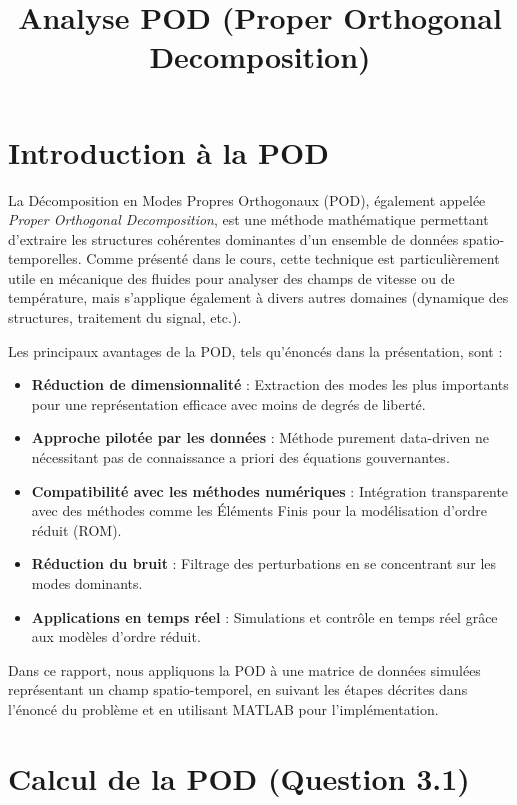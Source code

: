\documentclass{rapportECL}
\title{Analyse POD (Proper Orthogonal Decomposition)}
\begin{document}

\fairemarges
\fairepagedegarde
\tabledematieres

\section{Introduction à la POD}

La Décomposition en Modes Propres Orthogonaux (POD), également appelée \emph{Proper Orthogonal Decomposition}, est une méthode mathématique permettant d'extraire les structures cohérentes dominantes d'un ensemble de données spatio-temporelles. Comme présenté dans le cours, cette technique est particulièrement utile en mécanique des fluides pour analyser des champs de vitesse ou de température, mais s'applique également à divers autres domaines (dynamique des structures, traitement du signal, etc.).

Les principaux avantages de la POD, tels qu'énoncés dans la présentation, sont :
\begin{itemize}
    \item \textbf{Réduction de dimensionnalité} : Extraction des modes les plus importants pour une représentation efficace avec moins de degrés de liberté.
    \item \textbf{Approche pilotée par les données} : Méthode purement data-driven ne nécessitant pas de connaissance a priori des équations gouvernantes.
    \item \textbf{Compatibilité avec les méthodes numériques} : Intégration transparente avec des méthodes comme les Éléments Finis pour la modélisation d'ordre réduit (ROM).
    \item \textbf{Réduction du bruit} : Filtrage des perturbations en se concentrant sur les modes dominants.
    \item \textbf{Applications en temps réel} : Simulations et contrôle en temps réel grâce aux modèles d'ordre réduit.
\end{itemize}

Dans ce rapport, nous appliquons la POD à une matrice de données simulées représentant un champ spatio-temporel, en suivant les étapes décrites dans l'énoncé du problème et en utilisant MATLAB pour l'implémentation.

\section{Calcul de la POD (Question 3.1)}
\end{document}
